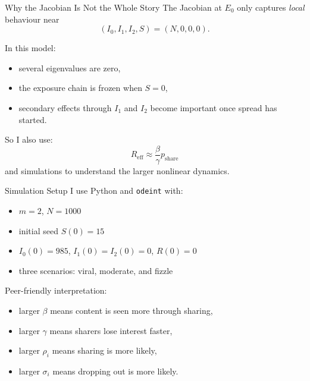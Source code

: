 \documentclass[aspectratio=169]{beamer}
\begin{document}
\begin{frame}{Why the Jacobian Is Not the Whole Story}
  The Jacobian at $E_0$ only captures \emph{local} behaviour near
  \[
  (I_0,I_1,I_2,S)=(N,0,0,0).
  \]

  \vspace{0.4em}
  In this model:
  \begin{itemize}
    \item several eigenvalues are zero,
    \item the exposure chain is frozen when $S=0$,
    \item secondary effects through $I_1$ and $I_2$ become important once spread has started.
  \end{itemize}

  \vspace{0.4em}
  So I also use:
  \[
  R_{\mathrm{eff}} \approx \frac{\beta}{\gamma}p_{\mathrm{share}}
  \]
  and simulations to understand the larger nonlinear dynamics.
\end{frame}

\begin{frame}{Simulation Setup}
  I use Python and \texttt{odeint} with:
  \begin{itemize}
    \item $m=2$, $N=1000$
    \item initial seed $S(0)=15$
    \item $I_0(0)=985$, $I_1(0)=I_2(0)=0$, $R(0)=0$
    \item three scenarios: viral, moderate, and fizzle
  \end{itemize}

  \vspace{0.4em}
  Peer-friendly interpretation:
  \begin{itemize}
    \item larger $\beta$ means content is seen more through sharing,
    \item larger $\gamma$ means sharers lose interest faster,
    \item larger $\rho_i$ means sharing is more likely,
    \item larger $\sigma_i$ means dropping out is more likely.
  \end{itemize}
\end{frame}
\end{document}

